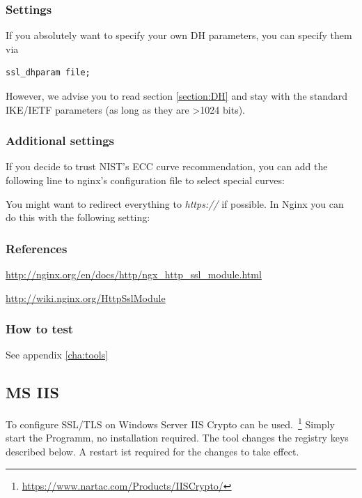 \subsubsection{Settings}
If you absolutely want to specify your own DH parameters, you can specify them via

\begin{lstlisting}
ssl_dhparam file;
\end{lstlisting}

However, we advise you to read section \ref{section:DH} and stay with the standard IKE/IETF parameters (as long as they are \textgreater 1024 bits).

\subsubsection{Additional settings}
If you decide to trust NIST's ECC curve recommendation, you can add the following line to nginx's configuration file to select special curves:


You might want to redirect everything to \emph{https://} if possible. In Nginx you can do this with the following setting:


\subsubsection{References} 
\begin{itemize*}
  \item \url{http://nginx.org/en/docs/http/ngx_http_ssl_module.html}
  \item \url{http://wiki.nginx.org/HttpSslModule}
\end{itemize*}

\subsubsection{How to test}
See appendix \ref{cha:tools}


\subsection{MS IIS}
\label{sec:ms-iis}

To configure SSL/TLS on Windows Server IIS Crypto can be used.~\footnote{\url{https://www.nartac.com/Products/IISCrypto/}}
Simply start the Programm, no installation required. The tool changes the registry keys described below.
A restart ist required for the changes to take effect.

